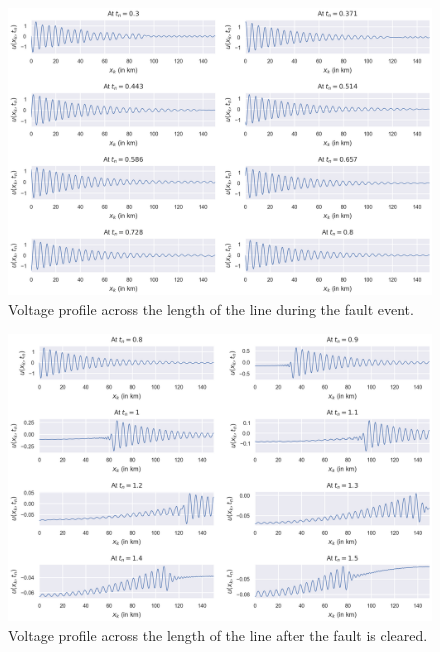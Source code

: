 \documentclass{article}
\begin{document}
\begin{figure}[t!]
	\centering
	\includegraphics[scale=0.7]{simulating a faulted bus - voltage profiles during fault.png}
	\caption{Voltage profile across the length of the line during the fault event.}
	\label{fig: Simulating a Faulted Bus results: Voltage profiles at during fault}
\end{figure}

\begin{figure}[t!]
	\centering
	\includegraphics[scale=0.7]{simulating a faulted bus - voltage profiles at post-fault.png}
	\caption{Voltage profile across the length of the line after the fault is cleared.}
	\label{fig: Simulating a Faulted Bus results: Voltage profiles at post-fault}
\end{figure}

%
\end{document}
